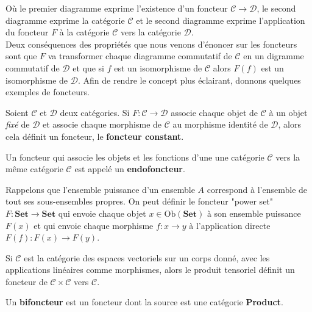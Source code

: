 \documentclass{article}
\begin{document}
Où le premier diagramme exprime l'existence d'un foncteur $\mathcal C\to\mathcal D$, le second diagramme exprime la catégorie $\mathcal C$ et le second diagramme exprime l'application du foncteur $F$ à la catégorie $\mathcal C$ vers la catégorie $\mathcal D$.\\

Deux conséquences des propriétés que nous venons d'énoncer sur les foncteurs sont que $F$ va transformer chaque diagramme commutatif de $\mathcal C$ en un digramme commutatif de $\mathcal D$ et que si $f$ est un isomorphisme de $\mathcal C$ alors $F(f)$ est un isomorphisme de $\mathcal D$. Afin de rendre le concept plus éclairant, donnons quelques exemples de foncteurs.

\begin{example}{}
    Soient $\mathcal C$ et $\mathcal D$ deux catégories. Si $F:\mathcal C\to\mathcal D$ associe chaque objet de $\mathcal C$ à un objet \textit{fixé} de $\mathcal D$ et associe chaque morphisme de $\mathcal C$ au morphisme identité de $\mathcal D$, alors cela définit un foncteur, le \textbf{foncteur constant}.
\end{example}

\begin{example}[Endofoncteur]{}
    Un foncteur qui associe les objets et les fonctions d'une une catégorie $\mathcal C$ vers la même catégorie $\mathcal C$ est appelé un \textbf{endofoncteur}.
\end{example}

\begin{example}{}
    Rappelons que l'ensemble puissance d'un ensemble $A$ correspond à l'ensemble de tout ses sous-ensembles propres. On peut définir le foncteur "power set" $F:\textbf{Set}\to\textbf{Set}$ qui envoie chaque objet $x\in\text{Ob}(\textbf{Set})$ à son ensemble puissance $F(x)$ et qui envoie chaque morphisme $f:x\to y$ à l'application directe $F(f):F(x)\to F(y)$.
\end{example}

\begin{example}{}
    Si $\mathcal C$ est la catégorie des espaces vectoriels sur un corps donné, avec les applications linéaires comme morphismes, alors le produit tensoriel définit un foncteur de $\mathcal C\times\mathcal C$ vers $\mathcal C$.
\end{example}

\begin{example}[Bifoncteur]{}
    Un \textbf{bifoncteur} est un foncteur dont la source est une catégorie \textbf{Product}.
\end{example}
\end{document}
